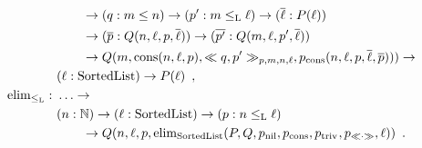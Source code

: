 \documentclass[orivec,envcountsame, ,envcountsect]{llncs}
\begin{document}
\begin{example}
\begin{align*}
                     & \qquad \to (q : m \leq n) \to (p' : m \lessList \ell) \to
                     (\overline{\ell} : P(\ell)) \\ 
                     & \qquad \to (\overline{p} : Q(n, \ell,p, \overline{\ell}))
                     \to (\overline{p'} : Q(m, \ell, p', \overline{\ell})) \\
                     & \qquad \to Q(m,\consList{n}{\ell}{p}, \consLess{m}{n}{\ell}{p}{q}{p'}, p_{\consListbare}(n, \ell, p, \overline{\ell}, \overline{p}))) \to \\
                     & (\ell : \SortedList) \to P(\ell) \enspace , \\
%
  \elim_{\lessList} :\ & \ldots \to \\
                     & (n : \Nat) \to (\ell : \SortedList) \to (p : n \lessList \ell) \\
                     & \qquad \to Q(n, \ell, p, \elim_{\SortedList}(P, Q, p_{\nilList}, p_{\consListbare},  p_{\nilLess{}}, p_{\consLessbare}, \ell)) \enspace .
  \end{align*}
 \end{example}
\end{document}
